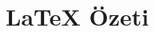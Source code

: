 \documentclass[aspectratio=169]{beamer}
\subtitle{Bölüm 3: Sadece Makaleler Değil: Sunumlar \& Daha Fazlası}
\begin{document}
\begin{frame}
\titlepage
\end{frame}


\section{\LaTeX{} Özeti}
\end{document}
